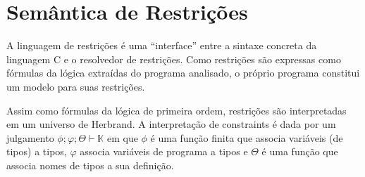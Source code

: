\documentclass[a4paper,8pt]{article}
\begin{document}
     \section{Semântica de Restrições}\label{semantics}

     A linguagem de restrições é uma ``interface'' entre a sintaxe
     concreta da linguagem C e o resolvedor de restrições. Como
     restrições são expressas como fórmulas da lógica extraídas do 
     programa analisado, o próprio programa constitui um modelo 
     para suas restrições.

     Assim como fórmulas da lógica de primeira ordem, restrições são
     interpretadas em um universo de Herbrand. A interpretação de
     constraints é dada por um julgamento 
     $\phi ; \varphi ; \Theta \vdash \mathbb{K}$ em que $\phi$ é uma
     função finita que associa variáveis (de tipos) a tipos, $\varphi$
     associa variáveis de programa a tipos e $\Theta$ é uma função
     que associa nomes de tipos a sua definição.
\end{document}
